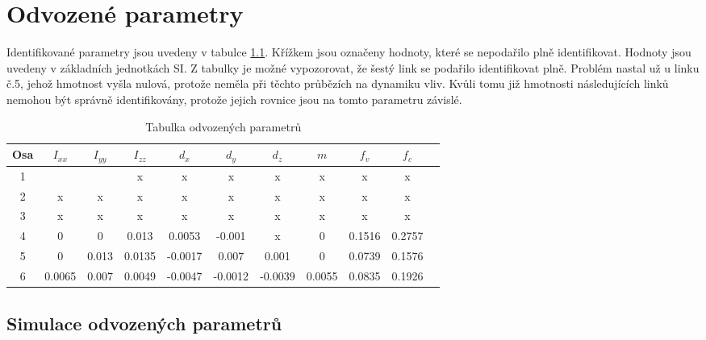 

\chapter{Odvozené parametry}

Identifikované parametry jsou uvedeny v tabulce \ref{tab_ind_hodnot}. Křížkem jsou označeny hodnoty, které se nepodařilo plně identifikovat. Hodnoty jsou uvedeny v základních jednotkách SI. Z tabulky je možné vypozorovat, že šestý link se podařilo identifikovat plně. Problém nastal už u linku č.5, jehož hmotnost vyšla nulová, protože neměla při těchto průbězích na dynamiku vliv. Kvůli tomu již hmotnosti následujících linků nemohou být správně identifikovány, protože jejich rovnice jsou na tomto parametru závislé.  
\\

\begin{table}[htbp]
  \centering
  \caption{Tabulka odvozených parametrů}
    \begin{tabular}{c|cccccccccc}
    \multicolumn{1}{c|}{Osa} & \multicolumn{1}{c}{$I_{xx}$} & \multicolumn{1}{c}{$I_{yy}$} & \multicolumn{1}{c}{$I_{zz}$} & \multicolumn{1}{c}{$d_x$} & \multicolumn{1}{c}{$d_y$} & \multicolumn{1}{c}{$d_z$} & \multicolumn{1}{c}{$m$} & \multicolumn{1}{c}{$f_v$} & \multicolumn{1}{c}{$f_c$} \\
    \hline
    1     &        &        &  x     &   x    &  x     &  x     &   x    &   x    & x \\
    2     &   x    &  x     &  x     &   x    &  x     &  x     &   x    &  x     & x \\
    3     &   x    & x      &   x    &   x    &   x    &    x   &   x    &  x     &  x\\
    4     &   0    &  0     & 0.013 & 0.0053 & -0.001 &   x    &   0    & 0.1516 &  0.2757\\
    5     & 0     & 0.013 & 0.0135 & -0.0017 & 0.007 & 0.001 & 0     & 0.0739 & 0.1576 \\
    6     & 0.0065 & 0.007 & 0.0049 & -0.0047 & -0.0012 & -0.0039 & 0.0055 & 0.0835 & 0.1926 \\
    \end{tabular}%
  \label{tab_ind_hodnot}%
\end{table}%

\newpage 

\section{Simulace odvozených parametrů}

